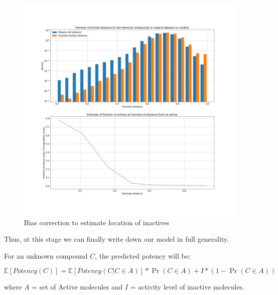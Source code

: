 \documentclass{article}
\begin{document}
\begin{figure}
    \centering
    \includegraphics[width=\textwidth]{fig5_bias_correction.png}
    \caption{Bias correction to estimate location of inactives}
    \label{fig:mal_cluster}
\end{figure}
\newline
\newline

Thus, at this stage we can finally write down our model in full generality.

For an unknown compound $C$, the predicted potency will be:

\begin{equation}
    \mathbb{E}[Potency(C)] = \mathbb{E}[Potency(C | C \in A)] * \Pr(C \in A) + I * (1-\Pr(C \in A))   
\end{equation}

where $A$ = set of Active molecules and $I$ = activity level of inactive molecules.
\end{document}
